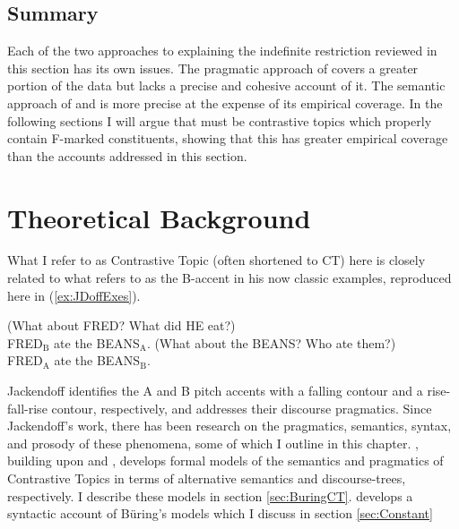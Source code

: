 \documentclass[
	letterpaper,
]{article}
\begin{document}
\subsection{Summary}
Each of the two approaches to explaining the indefinite restriction reviewed in this section has its own issues.
The pragmatic approach of \textcite{mikkelsen2005copular} covers a greater portion of the data but lacks a precise and cohesive account of it.
The semantic approach of \textcite{heycockkroch1999pseudocleft} and \textcite{heycock2012specification} is more precise at the expense of its empirical coverage.
In the following sections I will argue that must be contrastive topics which properly contain F-marked constituents, showing that this has greater empirical coverage than the accounts addressed in this section.
\section{Theoretical Background}\label{sec:TheoryBackground}
What I refer to as Contrastive Topic (often shortened to CT) here is closely related to what \textcite{jackendoff1972semantics} refers to as the B-accent in his now classic examples, reproduced here in (\ref{ex:JDoffExes}).
\begin{exe}
	\ex\label{ex:JDoffExes}
	\begin{xlist}
		\ex (What about FRED? What did HE eat?)\\
		FRED$_{\text{B}}$ ate the BEANS$_{\text{A}}$.
		\ex (What about the BEANS? Who ate them?)\\
		FRED$_{\text{A}}$ ate the BEANS$_{\text{B}}$.\hfill\parencite[261]{jackendoff1972semantics}
	\end{xlist}
\end{exe}
Jackendoff identifies the A and B pitch accents with a falling contour and a rise-fall-rise contour, respectively, and addresses their discourse pragmatics.
Since Jackendoff's work, there has been research on the pragmatics, semantics, syntax, and prosody of these phenomena, some of which I outline in this chapter.
\textcite{buring2003d}, building upon \textcite{rooth1992theory} and \textcite{roberts2012information}, develops formal models of the semantics and pragmatics of Contrastive Topics in terms of alternative semantics and discourse-trees, respectively. 
I describe these models in section \ref{sec:BuringCT}.
\textcite{constant2014diss} develops a syntactic account of B\"uring's models which I discuss in section \ref{sec:Constant}
\end{document}
